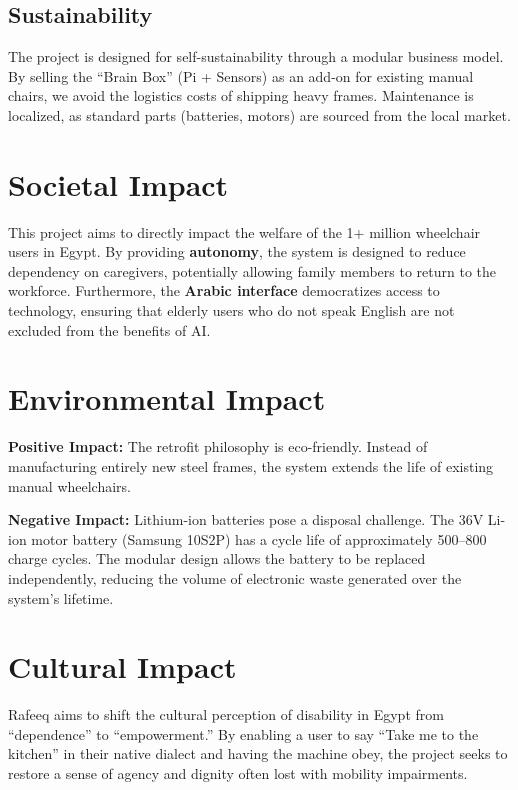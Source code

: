 \documentclass[12pt,a4paper]{report}
\begin{document}
\subsection{Sustainability}

The project is designed for self-sustainability through a modular business model. By selling the ``Brain Box'' (Pi + Sensors) as an add-on for existing manual chairs, we avoid the logistics costs of shipping heavy frames. Maintenance is localized, as standard parts (batteries, motors) are sourced from the local market.

\section{Societal Impact}

This project aims to directly impact the welfare of the 1+ million wheelchair users in Egypt. By providing \textbf{autonomy}, the system is designed to reduce dependency on caregivers, potentially allowing family members to return to the workforce. Furthermore, the \textbf{Arabic interface} democratizes access to technology, ensuring that elderly users who do not speak English are not excluded from the benefits of AI.

\section{Environmental Impact}

\textbf{Positive Impact:} The retrofit philosophy is eco-friendly. Instead of manufacturing entirely new steel frames, the system extends the life of existing manual wheelchairs.

\textbf{Negative Impact:} Lithium-ion batteries pose a disposal challenge. The 36V Li-ion motor battery (Samsung 10S2P) has a cycle life of approximately 500--800 charge cycles. The modular design allows the battery to be replaced independently, reducing the volume of electronic waste generated over the system's lifetime.

\section{Cultural Impact}

Rafeeq aims to shift the cultural perception of disability in Egypt from ``dependence'' to ``empowerment.'' By enabling a user to say ``Take me to the kitchen'' in their native dialect and having the machine obey, the project seeks to restore a sense of agency and dignity often lost with mobility impairments.
\end{document}
